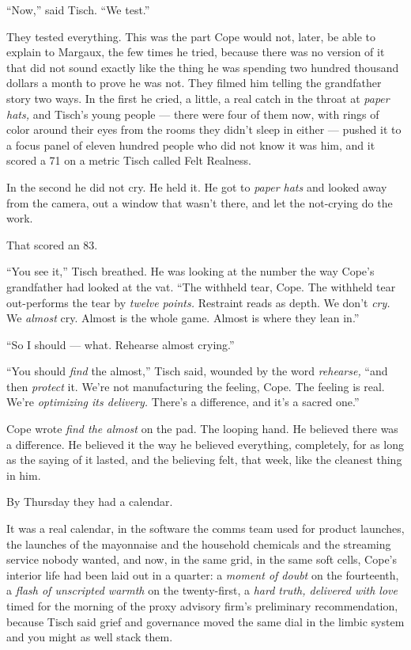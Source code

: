 \documentclass[11pt,openany]{book}
\newcommand{\scenebreak}{\par\vspace{0.5\baselineskip}\begin{center}\textasteriskcentered\quad\textasteriskcentered\quad\textasteriskcentered\end{center}\vspace{0.5\baselineskip}\par}
\begin{document}
``Now,'' said Tisch. ``We test.''

They tested everything. This was the part Cope would not, later, be able to explain to Margaux, the few times he tried, because there was no version of it that did not sound exactly like the thing he was spending two hundred thousand dollars a month to prove he was not. They filmed him telling the grandfather story two ways. In the first he cried, a little, a real catch in the throat at \textit{paper hats,} and Tisch's young people --- there were four of them now, with rings of color around their eyes from the rooms they didn't sleep in either --- pushed it to a focus panel of eleven hundred people who did not know it was him, and it scored a 71 on a metric Tisch called Felt Realness.

In the second he did not cry. He held it. He got to \textit{paper hats} and looked away from the camera, out a window that wasn't there, and let the not-crying do the work.

That scored an 83.

``You see it,'' Tisch breathed. He was looking at the number the way Cope's grandfather had looked at the vat. ``The withheld tear, Cope. The withheld tear out-performs the tear by \textit{twelve points.} Restraint reads as depth. We don't \textit{cry.} We \textit{almost} cry. Almost is the whole game. Almost is where they lean in.''

``So I should --- what. Rehearse almost crying.''

``You should \textit{find} the almost,'' Tisch said, wounded by the word \textit{rehearse,} ``and then \textit{protect} it. We're not manufacturing the feeling, Cope. The feeling is real. We're \textit{optimizing its delivery.} There's a difference, and it's a sacred one.''

Cope wrote \textit{find the almost} on the pad. The looping hand. He believed there was a difference. He believed it the way he believed everything, completely, for as long as the saying of it lasted, and the believing felt, that week, like the cleanest thing in him.


\scenebreak


By Thursday they had a calendar.

It was a real calendar, in the software the comms team used for product launches, the launches of the mayonnaise and the household chemicals and the streaming service nobody wanted, and now, in the same grid, in the same soft cells, Cope's interior life had been laid out in a quarter: a \textit{moment of doubt} on the fourteenth, a \textit{flash of unscripted warmth} on the twenty-first, a \textit{hard truth, delivered with love} timed for the morning of the proxy advisory firm's preliminary recommendation, because Tisch said grief and governance moved the same dial in the limbic system and you might as well stack them.
\end{document}
